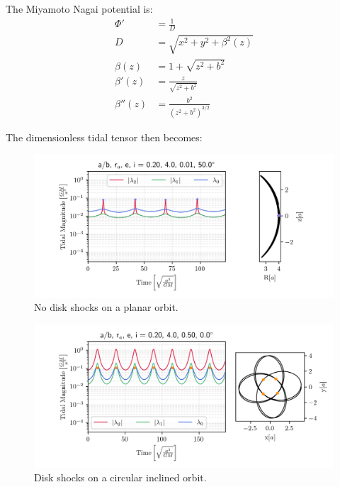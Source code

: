             The Miyamoto Nagai potential is: 
            \begin{eqnarray}
                \Phi'   &= \frac{1}{D}\\
                D       &= \sqrt{x^2 + y^2 + \beta^2(z)}\\
                \beta(z)   &= 1 + \sqrt{z^2 + b^2}\\
                \beta'(z) &= \frac{z}{\sqrt{z^2 + b^2}}\\
                \beta''(z)  &= \frac{b^2}{\left(z^2 + b^2\right)^{3/2}}
            \end{eqnarray}

            The dimensionless tidal tensor then becomes: 


            \begin{figure}
                \includegraphics[width=\linewidth]{images/miyamoto_disc_shocks_ab_rp_e_i_0.20_4.0_0.01_50.0.png}
                \caption{No disk shocks on a planar orbit.}
                \label{fig:miyamoto_disc_shocks_circular_inclined_orbit}
            \end{figure}



            \begin{figure}
                \includegraphics[width=\linewidth]{images/miyamoto_disc_shocks_ab_rp_e_i_0.20_4.0_0.50_0.0.png}
                \caption{Disk shocks on a circular inclined orbit.}
                \label{fig:miyamoto_disc_shocks_circular_inclined_orbit}
            \end{figure}

